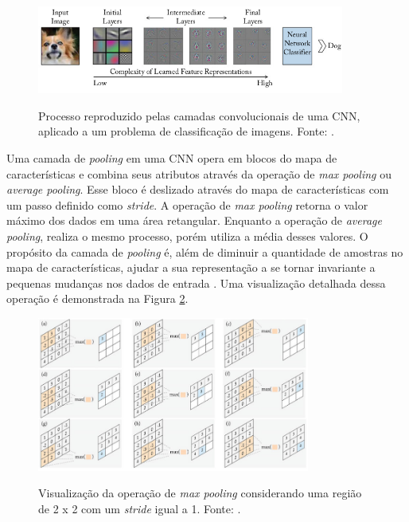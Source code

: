 \begin{figure}[h!]
\centering
\caption{Processo reproduzido pelas camadas convolucionais de uma CNN, aplicado a um problema de classificação de imagens. Fonte: \cite{khan}.}
\includegraphics[width=0.9\textwidth]{imgs/camadas-convolucionais}
\label{fig:camadas-convolucionais}
\end{figure}


Uma camada de \emph{pooling} em uma CNN opera em blocos do mapa de características e combina seus atributos através da operação de \emph{max pooling} ou \emph{average pooling}. Esse bloco é deslizado através do mapa de características com um passo definido como \emph{stride}. A operação de \emph{max pooling} retorna o valor máximo dos dados em uma área retangular. Enquanto a operação de \emph{average pooling}, realiza o mesmo processo, porém utiliza a média desses valores. O propósito da camada de \emph{pooling} é, além de diminuir a quantidade de amostras no mapa de características, ajudar a sua representação a se tornar invariante a pequenas mudanças nos dados de entrada \cite{khan, goodfellow}. Uma visualização detalhada dessa operação é demonstrada na Figura \ref{fig:pooling}.

\begin{figure}[h!]
  \centering
  \caption{Visualização da operação de \emph{max pooling} considerando uma região de 2 x 2 com um \emph{stride} igual a 1. Fonte: \cite{khan}.}
  \includegraphics[width=0.8\textwidth]{imgs/pooling}
  \label{fig:pooling}
\end{figure}

